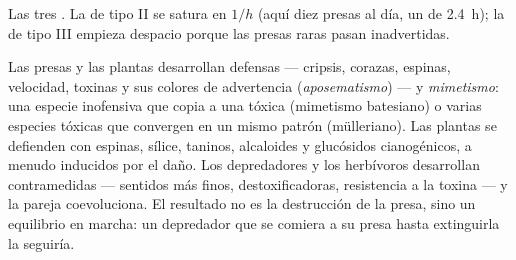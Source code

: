 \begin{omfigure}

{\small Las tres . La de tipo II se satura en $1/h$
(aquí diez presas al día, un  de \qty{2.4}{h}); la de
tipo III empieza despacio porque las presas raras pasan inadvertidas.}
\end{omfigure}

\begin{proposition}\label{prop:b1:species-interactions:defences}
Las presas y las plantas desarrollan defensas --- cripsis, corazas, espinas,
velocidad, toxinas y sus colores de advertencia (\emph{aposematismo}) --- y
\emph{mimetismo}: una especie inofensiva que copia a una tóxica (mimetismo
batesiano) o varias especies tóxicas que convergen en un mismo patrón
(mülleriano). Las plantas se defienden con espinas, sílice, taninos,
alcaloides y glucósidos cianogénicos, a menudo inducidos por el daño. Los
depredadores y los herbívoros desarrollan contramedidas --- sentidos más
finos,  destoxificadoras, resistencia a la toxina --- y la pareja
coevoluciona. El resultado no es la destrucción de la presa, sino un
equilibrio en marcha: un depredador que se comiera a su presa hasta
extinguirla la seguiría.
\end{proposition}

